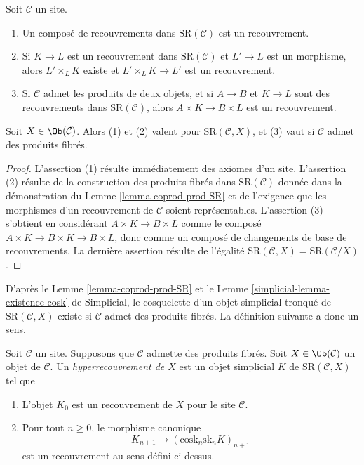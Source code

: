 \begin{lemma}
\label{lemma-covering-permanence}
Soit $\mathcal{C}$ un site.
\begin{enumerate}
\item Un composé de recouvrements dans $\text{SR}(\mathcal{C})$
est un recouvrement.
\item Si $K \to L$ est un recouvrement dans $\text{SR}(\mathcal{C})$
et $L' \to L$ est un morphisme, alors $L' \times_L K$ existe
et $L' \times_L K \to L'$ est un recouvrement.
\item Si $\mathcal{C}$ admet les produits de deux objets, et si
$A \to B$ et $K \to L$ sont des recouvrements dans $\text{SR}(\mathcal{C})$,
alors $A \times K \to B \times L$ est un recouvrement.
\end{enumerate}
Soit $X \in \Ob(\mathcal{C})$. Alors (1) et (2) valent pour
$\text{SR}(\mathcal{C}, X)$, et (3) vaut si $\mathcal{C}$
admet des produits fibrés.
\end{lemma}

\begin{proof}
L'assertion (1) résulte immédiatement des axiomes d'un site.
L'assertion (2) résulte de la construction des produits fibrés
dans $\text{SR}(\mathcal{C})$ donnée dans la démonstration du
Lemme \ref{lemma-coprod-prod-SR}
et de l'exigence que les morphismes d'un recouvrement
de $\mathcal{C}$ soient représentables.
L'assertion (3) s'obtient en considérant $A \times K \to B \times L$
comme le composé $A \times K \to B \times K \to B \times L$,
donc comme un composé de changements de base de recouvrements.
La dernière assertion résulte de l'égalité $\text{SR}(\mathcal{C}, X) =
\text{SR}(\mathcal{C}/X)$.
\end{proof}

\noindent
D'après le Lemme \ref{lemma-coprod-prod-SR} et le
Lemme \ref{simplicial-lemma-existence-cosk} de Simplicial,
le cosquelette d'un objet simplicial tronqué de
$\text{SR}(\mathcal{C}, X)$ existe si $\mathcal{C}$ admet des produits fibrés.
La définition suivante a donc un sens.

\begin{definition}
\label{definition-hypercovering}
Soit $\mathcal{C}$ un site. Supposons que $\mathcal{C}$ admette des produits fibrés.
Soit $X \in \Ob(\mathcal{C})$ un objet de $\mathcal{C}$.
Un {\it hyperrecouvrement de $X$} est un objet simplicial
$K$ de $\text{SR}(\mathcal{C}, X)$ tel que
\begin{enumerate}
\item L'objet $K_0$ est un recouvrement de $X$ pour le site $\mathcal{C}$.
\item Pour tout $n \geq 0$, le morphisme canonique
$$
K_{n + 1} \longrightarrow (\text{cosk}_n \text{sk}_n K)_{n + 1}
$$
est un recouvrement au sens défini ci-dessus.
\end{enumerate}
\end{definition}

